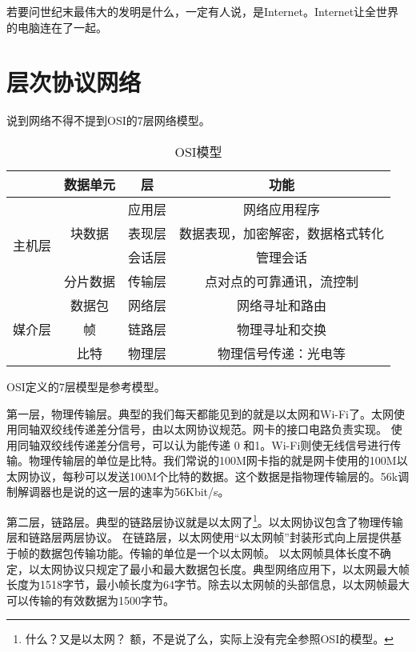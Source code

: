 

若要问世纪末最伟大的发明是什么，一定有人说，是Internet。Internet让全世界的电脑连在了一起。

\section{层次协议网络}

说到网络不得不提到OSI的7层网络模型。

\begin{table}[h]
\begin{center}
\caption{OSI模型}\label{tabel:ISOmodule}
\begin{tabular}{|c|c|c|c|}
\hline
& 数据单元 & 层 & 功能  \\ \hline %
\multirow{4}{*}{主机层}   &  \multirow{3}{*}{块数据} & 应用层  &  网络应用程序  \\ \cline{3-4}
&						 & 表现层 & 数据表现，加密解密，数据格式转化  \\ \cline{3-4}
&						 & 会话层 & 管理会话 \\ \cline{2-4}
& 分片数据  & 传输层 & 点对点的可靠通讯，流控制 \\ \hline
\multirow{3}{*}{媒介层}  & 数据包   & 网络层 & 网络寻址和路由 \\ \cline{2-4}
& 帧 & 链路层 & 物理寻址和交换 \\ \cline{2-4}
& 比特 & 物理层 & 物理信号传递：光电等 \\\hline
\end{tabular}
\end{center}
\end{table}

OSI定义的7层模型是参考模型。

第一层，物理传输层。典型的我们每天都能见到的就是以太网和Wi-Fi了。太网使用同轴双绞线传递差分信号，由以太网协议规范。网卡的接口电路负责实现。
使用同轴双绞线传递差分信号，可以认为能传递 0 和1。Wi-Fi则使无线信号进行传输。物理传输层的单位是比特。我们常说的100M网卡指的就是网卡使用的100M以太网协议，每秒可以发送100M个比特的数据。这个数据是指物理传输层的。56k调制解调器也是说的这一层的速率为56Kbit/s。


第二层，链路层。典型的链路层协议就是以太网了\footnote{什么？又是以太网？ 额，不是说了么，实际上没有完全参照OSI的模型。}。以太网协议包含了物理传输层和链路层两层协议。
在链路层，以太网使用“以太网帧”封装形式向上层提供基于帧的数据包传输功能。传输的单位是一个以太网帧。 以太网帧具体长度不确定，以太网协议只规定了最小和最大数据包长度。典型网络应用下，以太网最大帧长度为1518字节，最小帧长度为64字节。除去以太网帧的头部信息，以太网帧最大可以传输的有效数据为1500字节。

